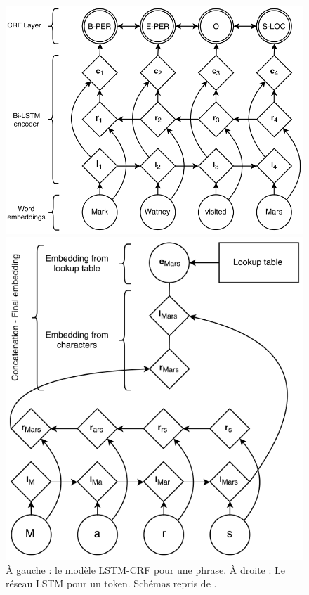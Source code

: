 \documentclass[citation\_needed]{subfiles}
\begin{document}
\begin{figure}[ht!]
\begin{minipage}{0.49\linewidth}
    \centering
    \includegraphics[scale=0.35]{images/LSTM/LSTM-CRF}
\end{minipage}
\begin{minipage}{0.49\linewidth}
    \centering
    \includegraphics[scale=0.4]{images/LSTM/LSTM-char}
\end{minipage}
\caption{À gauche : le modèle LSTM-CRF pour une phrase. À droite : Le réseau LSTM pour un token. Schémas repris de \citet{lample2016neural}.}
\label{fig:lstm-CRF}
\end{figure}
\end{document}

